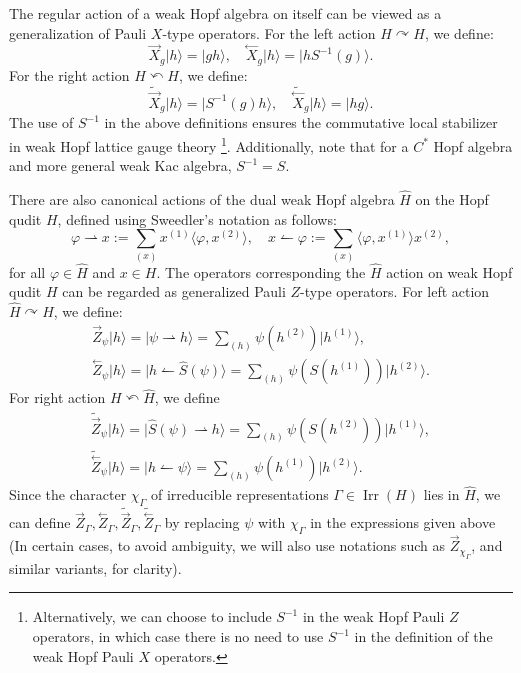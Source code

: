 \documentclass[a4paper,11pt]{article}
\theoremstyle{theorem}
\theoremstyle{remark}
\newcommand{\XR}{\overset{\rightarrow}{X}}
\newcommand{\XL}{\overset{\leftarrow}{X}}
\newcommand{\ZR}{\overset{\rightarrow}{Z}}
\newcommand{\ZL}{\overset{\leftarrow}{Z}}
\newcommand{\cone}{(1)}
\newcommand{\ctwo}{(2)}
\newcommand{\Irr}{\operatorname{Irr}}
\begin{document}
The regular action of a weak Hopf algebra on itself can be viewed as a generalization of Pauli $X$-type operators. For the left action $H \curvearrowright H$, we define:
\begin{equation}
\XR_g |h\rangle = |gh\rangle, \quad \XL_g |h\rangle = |hS^{-1}(g)\rangle.
\end{equation}
For the right action $H \curvearrowleft H$, we define:
\begin{equation}
\tilde{\XR}_g |h\rangle = |S^{-1}(g)h\rangle, \quad \tilde{\XL}_g |h\rangle = |hg\rangle.
\end{equation}
The use of $S^{-1}$ in the above definitions ensures the commutative local stabilizer in weak Hopf lattice gauge theory \cite{Jia2023weak} \footnote{Alternatively, we can choose to include $S^{-1}$ in the weak Hopf Pauli $Z$ operators, in which case there is no need to use $S^{-1}$ in the definition of the weak Hopf Pauli $X$ operators.
}. Additionally, note that for a $C^*$ Hopf algebra and more general weak Kac algebra, $S^{-1} = S$.


There are also canonical actions of the dual weak Hopf algebra $\hat{H}$ on the Hopf qudit $H$, defined using Sweedler’s notation as follows:
\begin{equation}
\varphi \rightharpoonup x:=\sum_{(x)}x^{(1)} \langle \varphi, x^{(2)}\rangle, \quad  x \leftharpoonup \varphi:=\sum_{(x)}   \langle \varphi,    x^{(1)}    \rangle  x^{(2)},
\end{equation}
for all $\varphi \in \hat{H}$ and $x \in H$.
The operators corresponding the $\hat{H}$ action on weak Hopf qudit $H$ can be regarded as generalized Pauli $Z$-type operators.
For left action $\hat{H}\curvearrowright H$, we define:
\begin{align}
      \ZR_{\psi}|h\rangle =|\psi \rightharpoonup h\rangle= \sum_{(h)}\psi(h^{\ctwo})|h^{\cone}\rangle,\\
      \ZL_{\psi}|h\rangle=|h \leftharpoonup \hat{S}(\psi)\rangle = \sum_{(h)}\psi(S(h^{\cone}))|h^{\ctwo}\rangle.
\end{align}
For right action $H \curvearrowleft \hat{H}$, we define
\begin{align}
     \tilde{\ZR}_{\psi}|h\rangle =|\hat{S}(\psi) \rightharpoonup h\rangle= \sum_{(h)}\psi(S(h^{\ctwo}))|h^{\cone}\rangle,\\
      \tilde{\ZL}_{\psi}|h\rangle=|h \leftharpoonup \psi\rangle = \sum_{(h)}\psi(h^{\cone})|h^{\ctwo}\rangle.
\end{align}
Since the character $\chi_{\Gamma}$ of irreducible representations $\Gamma \in \Irr(H)$ lies in $\hat{H}$, we can define $\ZR_{\Gamma}, \ZL_{\Gamma}, \tilde{\ZR}_{\Gamma}, \tilde{\ZL}_{\Gamma}$ by replacing $\psi$ with $\chi_{\Gamma}$ in the expressions given above (In certain cases, to avoid ambiguity, we will also use notations such as $\ZR_{\chi_{\Gamma}}$, and similar variants, for clarity).
\end{document}
